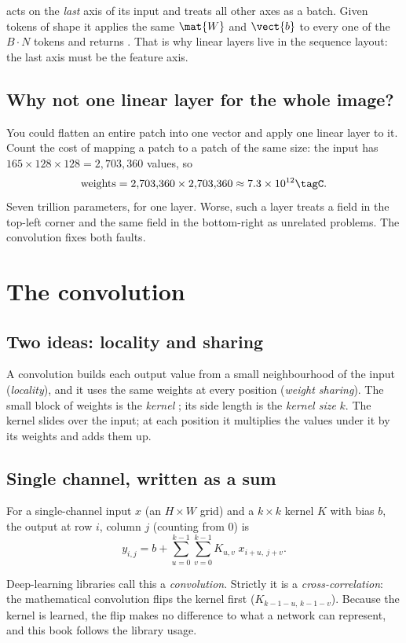  acts on the \emph{last} axis of its input and treats all other axes as a batch. Given
tokens of shape  it applies the same $\mat{W}$ and $\vect{b}$ to every one of the
$B\cdot N$ tokens and returns . That is why linear layers live in the sequence
layout: the last axis must be the feature axis.

\subsection{Why not one linear layer for the whole image?}

You could flatten an entire patch into one vector and apply one linear layer to it. Count the cost of
mapping a patch to a patch of the same size: the input has $165\times128\times128 = 2{,}703{,}360$
values, so
\[
\text{weights} = 2{,}703{,}360 \times 2{,}703{,}360 \approx 7.3\times10^{12}\tagC .
\]
Seven trillion parameters, for one layer. Worse, such a layer treats a field in the top-left corner and
the same field in the bottom-right as unrelated problems. The convolution fixes both faults.

\section{The convolution}\label{sec:shapes:conv}

\subsection{Two ideas: locality and sharing}

A convolution builds each output value from a small neighbourhood of the input
(\emph{locality}), and it uses the same weights at every position
(\emph{weight sharing}). The small block of weights is the \emph{kernel}%
; its side length is the \emph{kernel size} $k$. The kernel slides over the input; at
each position it multiplies the values under it by its weights and adds them up.

\subsection{Single channel, written as a sum}

\begin{definition}
For a single-channel input $x$ (an $H\times W$ grid) and a $k\times k$ kernel $K$ with bias $b$, the
output at row $i$, column $j$ (counting from $0$) is
\begin{equation}\label{eq:shapes:xcorr}
y_{i,j} = b + \sum_{u=0}^{k-1}\sum_{v=0}^{k-1} K_{u,v}\; x_{i+u,\ j+v}.
\end{equation}
\end{definition}
Deep-learning libraries call this a \emph{convolution}. Strictly it is a
\emph{cross-correlation}: the mathematical convolution flips the kernel first
($K_{k-1-u,\,k-1-v}$). Because the kernel is learned, the flip makes no difference to what a network can
represent, and this book follows the library usage.

